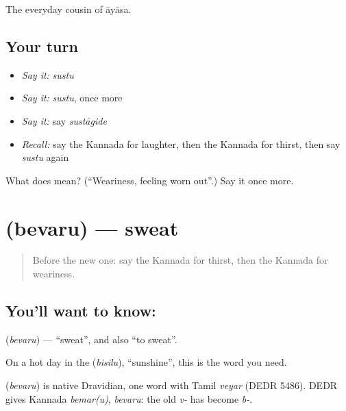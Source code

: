 \begin{grammarlens}[title={What you've built}]
The everyday cousin of āyāsa.
\end{grammarlens}

\subsection*{Your turn}
\begin{itemize}
\raggedright
  \item \emph{Say it:} \emph{sustu}
  \item \emph{Say it:} \emph{sustu}, once more
  \item \emph{Say it:} say \emph{sustāgide}
  \item \emph{Recall:} say the Kannada for laughter, then the Kannada for thirst, then say \emph{sustu} again
\end{itemize}

\begin{tcolorbox}[breakable,colback=teal!4,colframe=teal!35!black,title={Before you move on}]
What does  mean? (\textquotedblleft{}Weariness, feeling worn out\textquotedblright{}.) Say it once more.
\end{tcolorbox}
\section[\texorpdfstring{\kn{ಬೆವರು} (bevaru)}{ಬೆವರು (bevaru)}]{ (bevaru) — sweat}

\label{lesson:KA-C84-sweat}



\begin{quote}
Before the new one: say the Kannada for thirst, then the Kannada for weariness.
\end{quote}

\subsection*{You'll want to know: }
\textbf{} (\emph{bevaru}) — \textquotedblleft{}sweat\textquotedblright{}, and also \textquotedblleft{}to sweat\textquotedblright{}.

On a hot day in the \textbf{} (\emph{bisilu}), \textquotedblleft{}sunshine\textquotedblright{}, this is the word you need.

\begin{cousinweb}
\textbf{} (\emph{bevaru}) is native Dravidian, one word with Tamil \emph{veyar} (DEDR 5486). DEDR gives Kannada \emph{bemar(u)}, \emph{bevaru}: the old \emph{v-} has become \emph{b-}.
\end{cousinweb}

